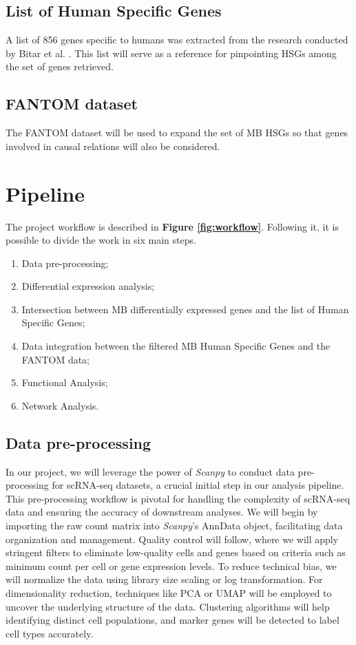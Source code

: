 \documentclass[10pt]{SelfArx} %
\begin{document}
\subsection{List of Human Specific Genes}\label{sec:list_genes}
A list of 856 genes specific to humans was extracted from the research conducted by Bitar et al. \cite{bitar2019genes}. This list will serve as a reference for pinpointing HSGs among the set of genes retrieved. \\

\subsection{FANTOM dataset}\label{sec:Fantom_dataset}
The FANTOM \cite{fantom5} dataset will be used to expand the set of MB HSGs so that genes involved in causal relations will also be considered.

\section{Pipeline}\label{sec:pipeline}
The project workflow is described in \textbf{Figure \ref{fig:workflow}}. Following it, it is possible to divide the work in six main steps.

\begin{enumerate}
    \item Data pre-processing;
    \item Differential expression analysis; 
    \item Intersection between MB differentially expressed genes and the list of Human Specific Genes;
    \item Data integration between the filtered MB Human Specific Genes and the FANTOM data;
    \item Functional Analysis;
    \item Network Analysis.
\end{enumerate}

\subsection{Data pre-processing}\label{sec:pre_processing}
In our project, we will leverage the power of \textit{Scanpy} \cite{wolf2018scanpy} to conduct data pre-processing for scRNA-seq datasets, a crucial initial step in our analysis pipeline. This pre-processing workflow is pivotal for handling the complexity of scRNA-seq data and ensuring the accuracy of downstream analyses. We will begin by importing the raw count matrix into \textit{Scanpy}'s AnnData object, facilitating data organization and management. Quality control will follow, where we will apply stringent filters to eliminate low-quality cells and genes based on criteria such as minimum count per cell or gene expression levels. To reduce technical bias, we will normalize the data using library size scaling or log transformation. For dimensionality reduction, techniques like PCA or UMAP will be employed to uncover the underlying structure of the data. Clustering algorithms will help identifying distinct cell populations, and marker genes will be detected to label cell types accurately. \\
\end{document}
